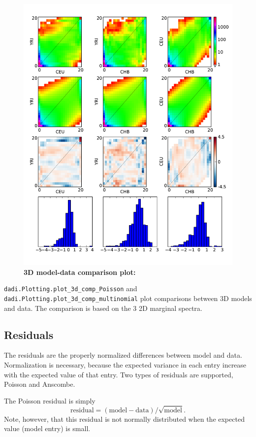 \documentclass[12pt]{article}
\makeatletter
\newcommand{\py}[1]{\lstinline[language=Python, showstringspaces=False]@#1@}
\makeatother
\begin{document}
\begin{figure}
\centering
\includegraphics[scale=0.5]{3d_comp}
\caption{\textbf{3D model-data comparison plot:}\label{fig:3d_comp}}
\end{figure}

\py{dadi.Plotting.plot_3d_comp_Poisson} and \py{dadi.Plotting.plot_3d_comp_multinomial} plot comparisons between 3D models and data.
The comparison is based on the 3 2D marginal spectra.

\subsection{Residuals}\label{sec:residuals}

The residuals are the properly normalized differences between model and data.
Normalization is necessary, because the expected variance in each entry increase with the expected value of that entry.
Two types of residuals are supported, Poisson and Anscombe.

The Poisson residual is simply
\begin{equation}
\text{residual} = (\text{model} - \text{data})/\sqrt{\text{model}}.
\end{equation}
Note, however, that this residual is not normally distributed when the expected value (model entry) is small.
\end{document}
